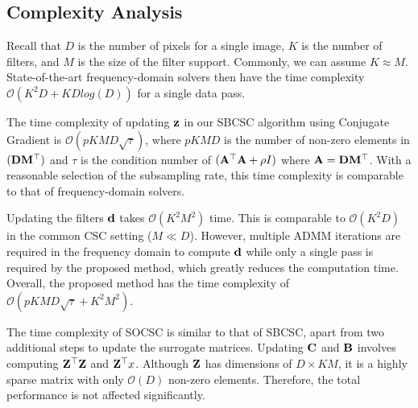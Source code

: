 \subsection{Complexity Analysis}
Recall that $D$ is the number of pixels for a single image, $K$ is the
number of filters, and $M$ is the size of the filter
support. Commonly, we can assume $K \approx M$.  State-of-the-art
frequency-domain solvers then have the time complexity
$\mathcal{O}(K^2D + KDlog(D))$ for a single data pass.

The time complexity of updating $\code$ in our SBCSC algorithm using
Conjugate Gradient is $\mathcal{O}(pKMD \sqrt{\tau})$, where $pKMD$ is
the number of non-zero elements in $(\Filter \mask^\top)$ and $\tau$
is the condition number of $(\matA^\top \matA + \rho I)$ where $\matA
= \Filter \mask^\top$. With a reasonable selection of the subsampling
rate, this time complexity is comparable to that of frequency-domain
solvers.

Updating the filters $\filter$ takes $\mathcal{O}(K^2M^2)$ time. This
is comparable to $\mathcal{O}(K^2D)$ in the common CSC setting ($M \ll
D$). However, multiple ADMM iterations are required in the frequency
domain to compute $\filter$ while only a single pass is required by
the proposed method, which greatly reduces the computation
time. Overall, the proposed method has the time complexity of
$\mathcal{O}(pKMD \sqrt{\tau} + K^2M^2)$.

The time complexity of SOCSC is similar to that of SBCSC, apart from
two additional steps to update the surrogate matrices. Updating
$\surC$ and $\surB$ involves computing $\Code^\top\Code$ and
$\Code^\top x$. Although $\Code$ has dimensions of $D \times KM$, it
is a highly sparse matrix with only $\mathcal{O}(D)$ non-zero
elements. Therefore, the total performance is not affected
significantly.



